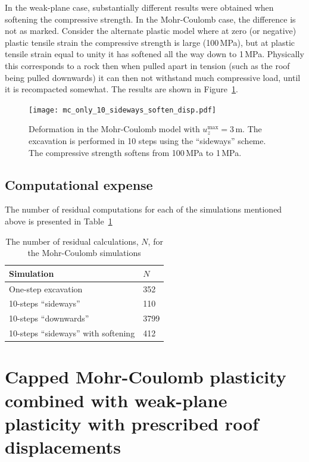 \documentclass[]{scrreprt}
\begin{document}
In the weak-plane case, substantially different results were obtained
when softening the compressive strength.  In the Mohr-Coulomb case,
the difference is not as marked.  Consider the alternate plastic model
where at zero (or negative) plastic tensile strain the compressive strength
is large (100\,MPa), but at plastic tensile strain equal to unity it
has softened all the way down to 1\,MPa.  Physically this corresponds
to a rock then when pulled apart in tension (such as the roof being
pulled downwards) it can then not withstand much compressive load,
until it is recompacted somewhat.  The results are shown in Figure~\ref{mc.10_sideways_soften_soften}.

\begin{figure}[htb]
\begin{center}
\texttt{[image: mc\_only\_10\_sideways\_soften\_disp.pdf]}
\caption{Deformation in the Mohr-Coulomb model with
  $u_{z}^{\mathrm{max}} = 3$\,m.  The excavation is performed in 10
  steps using the ``sideways'' scheme.  The compressive strength
  softens from 100\,MPa to 1\,MPa.}
\label{mc.10_sideways_soften_soften}
\end{center}
\end{figure}

\section{Computational expense}

The number of residual computations for each of the simulations
mentioned above is presented in Table~\ref{mc.n}

\begin{table}[htb]
\begin{center}
\begin{tabular}{ll}
Simulation & $N$ \\
\hline
One-step excavation & 352 \\
10-steps ``sideways'' & 110 \\
10-steps ``downwards'' & 3799 \\
10-steps ``sideways'' with softening & 412
\end{tabular}
\caption{The number of residual calculations, $N$, for the Mohr-Coulomb
  simulations}
\label{mc.n}
\end{center}
\end{table}

\chapter{Capped Mohr-Coulomb plasticity combined with weak-plane
  plasticity with prescribed roof displacements}
\end{document}
